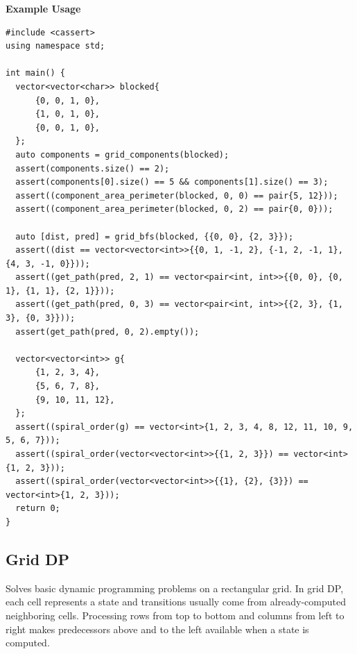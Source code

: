 \textbf{Example Usage}\par
\begin{lstlisting}[style=cpp]
#include <cassert>
using namespace std;

int main() {
  vector<vector<char>> blocked{
      {0, 0, 1, 0},
      {1, 0, 1, 0},
      {0, 0, 1, 0},
  };
  auto components = grid_components(blocked);
  assert(components.size() == 2);
  assert(components[0].size() == 5 && components[1].size() == 3);
  assert((component_area_perimeter(blocked, 0, 0) == pair{5, 12}));
  assert((component_area_perimeter(blocked, 0, 2) == pair{0, 0}));

  auto [dist, pred] = grid_bfs(blocked, {{0, 0}, {2, 3}});
  assert((dist == vector<vector<int>>{{0, 1, -1, 2}, {-1, 2, -1, 1}, {4, 3, -1, 0}}));
  assert((get_path(pred, 2, 1) == vector<pair<int, int>>{{0, 0}, {0, 1}, {1, 1}, {2, 1}}));
  assert((get_path(pred, 0, 3) == vector<pair<int, int>>{{2, 3}, {1, 3}, {0, 3}}));
  assert(get_path(pred, 0, 2).empty());

  vector<vector<int>> g{
      {1, 2, 3, 4},
      {5, 6, 7, 8},
      {9, 10, 11, 12},
  };
  assert((spiral_order(g) == vector<int>{1, 2, 3, 4, 8, 12, 11, 10, 9, 5, 6, 7}));
  assert((spiral_order(vector<vector<int>>{{1, 2, 3}}) == vector<int>{1, 2, 3}));
  assert((spiral_order(vector<vector<int>>{{1}, {2}, {3}}) == vector<int>{1, 2, 3}));
  return 0;
}
\end{lstlisting}
\subsection{Grid DP}
\label{sec:1.4.3}
Solves basic dynamic programming problems on a rectangular grid. In grid DP, each cell represents a state and transitions usually come from already-computed neighboring cells. Processing rows from top to bottom and columns from left to right makes predecessors above and to the left available when a state is computed.

